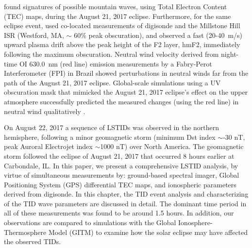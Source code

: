 \documentclass[crop=false,class=mitthesis,oneside,font=12pt]{standalone}
\begin{document}
\citet{coster_gnss_2017} found signatures of possible mountain waves, using Total Electron Content (TEC) maps, during the August 21, 2017 eclipse. Furthermore, for the same eclipse event, \citet{goncharenko_mh_hill_eclipse} used co-located measurements of digisonde and the Millstone Hill ISR (Westford, MA, $\sim$ 60\% peak obscuration), and observed a fast (20-40~m/s) upward plasma drift above the peak height of the F2 layer, hmF2, immediately following the maximum obscuration. Neutral wind velocity derived from night-time OI 630.0~nm (red line) emission measurements by a Fabry-Perot Interferometer (FPI) in Brazil showed perturbations in neutral winds far from the path of the August 21, 2017 eclipse. Global-scale simulations using a UV obscuration mask that mimicked the August 21, 2017 eclipse's effect on the upper atmosphere successfully predicted the measured changes (using the red line) in neutral wind qualitatively \citep{harding_nightside_eclipse}.


On August 22, 2017 a sequence of LSTIDs was observed in the northern hemisphere, following a minor geomagnetic storm (minimum Dst index $\sim$-30 nT, peak Auroral Electrojet index $\sim$1000 nT) over North America. The geomagnetic storm followed the eclipse of August 21, 2017 that occurred 8 hours earlier at Carbondale, IL. In this paper, we present a comprehensive LSTID analysis, by virtue of simultaneous measurements by: ground-based spectral imager, Global Positioning System (GPS) differential TEC maps, and ionospheric parameters derived from digisonde. In this chapter, the TID event analysis and characterizing of the TID wave parameters are discussed in detail. The dominant time period in all of these measurements was found to be around 1.5 hours. In addition, our observations are compared to simulations with the Global Ionosphere-Thermosphere Model (GITM) \citep{ridley_global_2006} to examine how the solar eclipse may have affected the observed TIDs.
\end{document}
